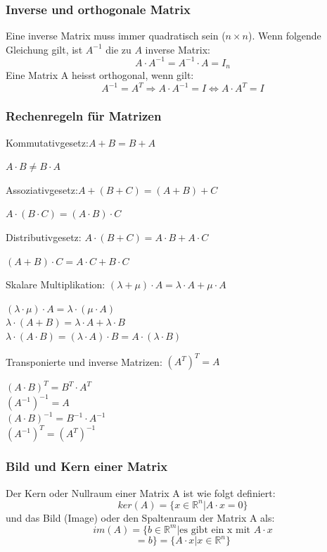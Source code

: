 \documentclass[10pt]{scrartcl}
\begin{document}
\begin{multicols}{2}
\subsubsection*{Inverse und orthogonale Matrix}
Eine inverse Matrix muss immer quadratisch sein ($n \times n$). Wenn folgende Gleichung gilt, ist $A^{-1}$ die zu $A$ inverse Matrix:
\begin{equation}
A \cdot A^{-1} = A^{-1} \cdot A = I_n
\end{equation}
Eine Matrix A heisst orthogonal, wenn gilt:
\begin{equation}
A^{-1} = A^{T} \Rightarrow A\cdot A^{-1} = I \Leftrightarrow A \cdot A^{T} = I
\end{equation}
\subsubsection*{Rechenregeln für Matrizen}
Kommutativgesetz:\hfill $A + B = B + A$ \begin{flushright} $A \cdot B \neq B \cdot A$ \end{flushright}
Assoziativgesetz:\hfill $A+(B+C) = (A+B)+C$ \begin{flushright} $A \cdot (B \cdot C) = (A \cdot B) \cdot C$ \end{flushright}
Distributivgesetz:\hfill
$A \cdot (B+C) = A \cdot B + A \cdot C$ \begin{flushright} $(A+B) \cdot C = A \cdot C + B \cdot C$\end{flushright}
Skalare Multiplikation:\hfill
$(\lambda + \mu) \cdot A = \lambda \cdot A + \mu \cdot A$ \begin{flushright}
$(\lambda \cdot \mu) \cdot A = \lambda \cdot (\mu \cdot A)$\\
$\lambda \cdot (A+B) = \lambda \cdot A + \lambda \cdot B$ \\
$\lambda \cdot (A \cdot B) = (\lambda \cdot A) \cdot B = A \cdot (\lambda \cdot B)$\end{flushright}
Transponierte und inverse Matrizen:\hfill
$(A^T)^T = A$ \begin{flushright}
$(A \cdot B)^T = B^T \cdot A^T$ \\
$(A^{-1})^{-1} = A$ \\
$(A \cdot B)^{-1} = B^{-1} \cdot A^{-1}$\\
$(A^{-1})^T = (A^T)^{-1}$ \end{flushright}
\subsubsection*{Bild und Kern einer Matrix}
Der Kern oder Nullraum einer Matrix A ist wie folgt definiert:
\begin{equation}
ker(A) = \lbrace x \in \mathbb{R}^n | A \cdot x = 0 \rbrace
\end{equation}
und das Bild (Image) oder den Spaltenraum der Matrix A als:
\begin{equation}
im(A) = \lbrace b \in \mathbb{R}^m | \text{es gibt ein x mit } A \cdot x\end{equation}
\[= b \rbrace = \lbrace A \cdot x | x \in \mathbb{R}^n \rbrace\]


\end{multicols}
\end{document}

